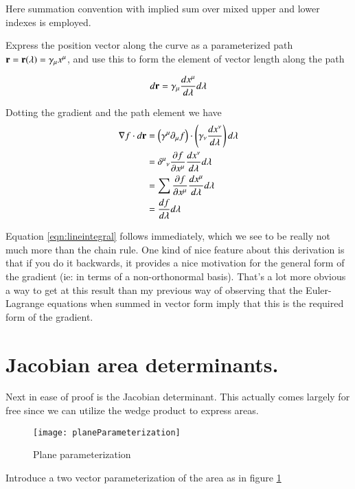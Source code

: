 \documentclass{article}
\newcommand{\grad}[0]{\nabla}
\newcommand{\PD}[2]{\frac{\partial {#2}}{\partial {#1}}}
\begin{document}
Here summation convention with implied sum over mixed upper and lower indexes is employed.

Express the position vector along the curve as
a parameterized path $\mathbf{r} = \mathbf{r}(\lambda) = \gamma_{\mu} x^{\mu}$, and use
this to form the element of vector length along the path

\begin{equation*}
d\mathbf{r} = \gamma_{\mu} \frac{d x^{\mu}}{d\lambda} d\lambda
\end{equation*}

Dotting the gradient and the path element we have
\begin{align*}
\grad f \cdot d\Br 
&= \left(\gamma^{\mu} \partial_{\mu} f\right) \cdot \left(\gamma_{\nu} \frac{d x^{\nu}}{d\lambda} \right) d\lambda \\
&= {\delta^{\mu}}_{\nu} \PD{x^{\mu}}{f} \frac{d x^{\nu}}{d\lambda} d\lambda \\
&= \sum \PD{x^{\mu}}{f} \frac{d x^{\mu}}{d\lambda} d\lambda \\
&= \frac{d f}{d \lambda} d\lambda
\end{align*}

Equation \ref{eqn:lineintegral} follows immediately, which we see to be really not much more than the chain rule.  One kind of nice feature
about this derivation is that if you do it backwards, it provides a nice motivation for the general form of the gradient (ie: in terms
of a non-orthonormal basis).  That's a lot more obvious a way to get at this result than my previous way of observing that the Euler-Lagrange
equations when summed in vector form imply that this is the required form of the gradient.

\section{ Jacobian area determinants. }

Next in ease of proof is the Jacobian determinant.  This actually comes largely for free since we can utilize the wedge product to
express areas.

\begin{figure}[htp]
\centering
\texttt{[image: planeParameterization]}
\caption{Plane parameterization}\label{fig:planeParameterization}
\end{figure}

Introduce a two vector parameterization of the area as in figure \ref{fig:planeParameterization}
\end{document}
